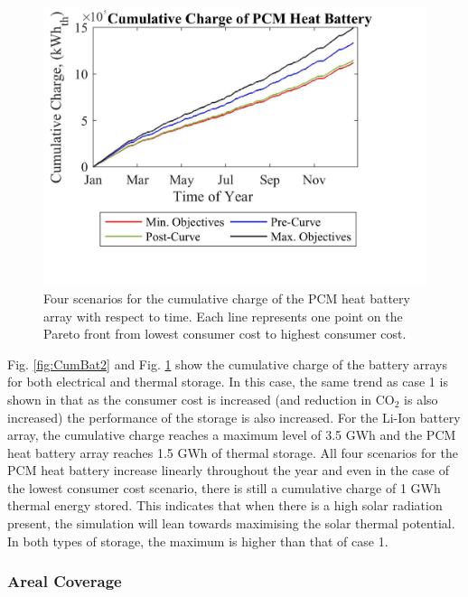  \begin{figure}[H]
	\centering
    \includegraphics[width=1.12\columnwidth]{Figures/CumHBat2.png}
    \caption{Four scenarios for the cumulative charge of the PCM heat battery array with respect to time. Each line represents one point on the Pareto front from lowest consumer cost to highest consumer cost.}
    \label{fig:CumHBat2}
\end{figure}


Fig. \ref{fig:CumBat2} and Fig. \ref{fig:CumHBat2} show the cumulative charge of the battery arrays for both electrical and thermal storage. In this case, the same trend as case 1 is shown in that as the consumer cost is increased (and reduction in CO$_2$ is also increased) the performance of the storage is also increased. For the Li-Ion battery array, 
the cumulative charge reaches a maximum level of 3.5 GWh and the PCM heat battery array reaches 1.5 GWh of thermal storage. All four scenarios for the PCM heat battery increase linearly throughout the year and even in the case of the lowest consumer cost scenario, there is still a cumulative charge of 1 GWh thermal energy stored. This indicates that when there is a high solar radiation present, the simulation will lean towards maximising the solar thermal potential. In both types of storage, the maximum is higher than that of case 1.

\subsubsection{Areal Coverage}

